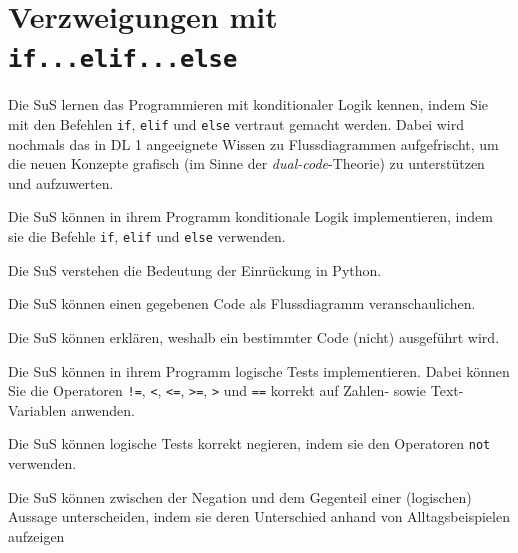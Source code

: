 \section{Verzweigungen mit \texorpdfstring{\lstinline|if...elif...else|}{if...elif...else}}
\begin{myExBox}
	Die SuS lernen das Programmieren mit konditionaler Logik kennen, indem Sie mit den Befehlen \lstinline|if|, \lstinline|elif| und \lstinline|else| vertraut gemacht werden. Dabei wird nochmals das in DL 1 angeeignete Wissen zu Flussdiagrammen aufgefrischt, um die neuen Konzepte grafisch (im Sinne der \textit{dual-code}-Theorie) zu unterstützen und aufzuwerten.

	\begin{todolist}
		\item Die SuS können in ihrem Programm konditionale Logik implementieren, indem sie die Befehle \lstinline|if|, \lstinline|elif| und \lstinline|else| verwenden.
		\item Die SuS verstehen die Bedeutung der Einrückung in Python.
		\item Die SuS können einen gegebenen Code als Flussdiagramm veranschaulichen.
		\item Die SuS können erklären, weshalb ein bestimmter Code (nicht) ausgeführt wird.
		\item Die SuS können in ihrem Programm logische Tests implementieren. Dabei können Sie die Operatoren \lstinline|!=|, \lstinline|<|, \lstinline|<=|, \lstinline|>=|, \lstinline|>| und \lstinline|==| korrekt auf Zahlen- sowie Text-Variablen anwenden.
		\item Die SuS können logische Tests korrekt negieren, indem sie den Operatoren \lstinline|not| verwenden.
		\item Die SuS können zwischen der Negation und dem Gegenteil einer (logischen) Aussage unterscheiden, indem sie deren Unterschied anhand von Alltagsbeispielen aufzeigen
	\end{todolist}


\end{myExBox}
